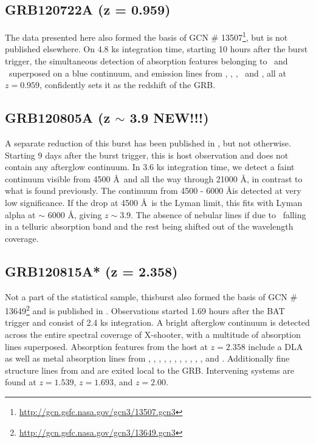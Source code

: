 \documentclass{aa}    %
\begin{document}
\subsection{GRB120722A (z = 0.959)}
The data presented here also formed the basis of GCN \#
13507\footnote{\url{http://gcn.gsfc.nasa.gov/gcn3/13507.gcn3}}, but is not
published elsewhere. On 4.8 ks integration time, starting 10 hours after the
burst trigger, the simultaneous detection of absorption features belonging to
\mgii~and \feii~superposed on a blue continuum, and emission lines from \oii,
\hg, \hb, \oiii~and \ha, all at $z = 0.959$, confidently sets it as the
redshift of the GRB.



\subsection{GRB120805A (z $\sim$ 3.9 NEW!!!)}
A separate reduction of this burst has been published in \citet{Kruhler2015},
but not otherwise. Starting 9 days after the burst trigger, this is host
observation and does not contain any afterglow continuum. In 3.6 ks integration
time, we detect a faint continuum visible from 4500 \AA~and all the way through
21000 \AA, in contrast to what is found previously. The continuum from 4500 -
6000 \AA is detected at very low significance. If the drop at 4500 \AA~is the
Lyman limit, this fits with Lyman alpha at $\sim$ 6000 \AA, giving $z \sim
3.9$. The absence of nebular lines if due to \oii~falling in a telluric
absorption band and the rest being shifted out of the wavelength coverage.

\subsection{GRB120815A* (z = 2.358)} 
Not a part of the statistical sample, thisburst also formed the basis of  GCN
\# 13649\footnote{\url{http://gcn.gsfc.nasa.gov/gcn3/13649.gcn3}} and is
published in \citet{Kruhler2013}. Observations started 1.69 hours after the BAT
trigger and consist of 2.4 ks integration. A bright afterglow continuum is
detected across the entire spectral coverage of X-shooter, with a multitude of
absorption lines superposed. Absorption features from the host at $z = 2.358$
include a DLA as well as metal absorption lines from \nv, \sii, \SIii, \oi,
\civ, \SIiv, \feii, \alii, \aliii, \mnii, \mgii, and \mgi. Additionally
fine structure lines from \NIii and \feii are exited local to the GRB.
Intervening systems are found at $z = 1.539$, $z = 1.693$, and $z = 2.00$.
\end{document}
